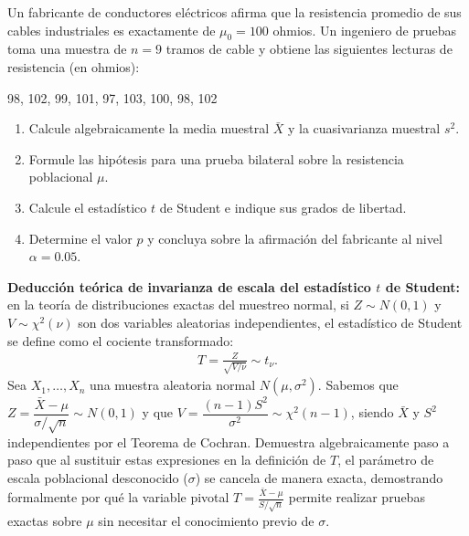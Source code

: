 \begin{problema}
	\label{prob:4072ece}
	Un fabricante de conductores eléctricos afirma que la resistencia promedio de sus cables industriales es exactamente de $\mu_0 = 100$ ohmios. Un ingeniero de pruebas toma una muestra de $n = 9$ tramos de cable y obtiene las siguientes lecturas de resistencia (en ohmios):
	\begin{center}
		98, 102, 99, 101, 97, 103, 100, 98, 102
	\end{center}
	\begin{enumerate}
		\item Calcule algebraicamente la media muestral $\bar{X}$ y la cuasivarianza muestral $s^2$.
		\item Formule las hipótesis para una prueba bilateral sobre la resistencia poblacional $\mu$.
		\item Calcule el estadístico $t$ de Student e indique sus grados de libertad.
		\item Determine el valor $p$ y concluya sobre la afirmación del fabricante al nivel $\alpha = 0.05$.
	\end{enumerate}
\end{problema}

\begin{problema}
	\label{prob:6c535e4}
	\textbf{Deducción teórica de invarianza de escala del estadístico $t$ de Student:} en la teoría de distribuciones exactas del muestreo normal, si $Z \sim N(0,1)$ y $V \sim \chi^2(\nu)$ son dos variables aleatorias independientes, el estadístico de Student se define como el cociente transformado:
	\begin{align}
		T = \frac{Z}{\sqrt{V / \nu}} \sim t_\nu.
	\end{align}
	Sea $X_1, \dots, X_n$ una muestra aleatoria normal $N(\mu, \sigma^2)$. Sabemos que $Z = \dfrac{\bar{X} - \mu}{\sigma/\sqrt{n}} \sim N(0,1)$ y que $V = \dfrac{(n-1)S^2}{\sigma^2} \sim \chi^2(n-1)$, siendo $\bar{X}$ y $S^2$ independientes por el Teorema de Cochran. Demuestra algebraicamente paso a paso que al sustituir estas expresiones en la definición de $T$, el parámetro de escala poblacional desconocido ($\sigma$) se cancela de manera exacta, demostrando formalmente por qué la variable pivotal $\displaystyle T = \frac{\bar{X} - \mu}{S/\sqrt{n}}$ permite realizar pruebas exactas sobre $\mu$ sin necesitar el conocimiento previo de $\sigma$.
\end{problema}

